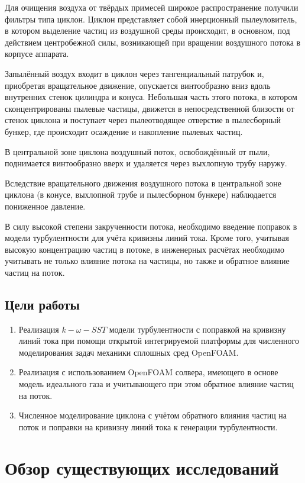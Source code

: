 \documentclass[pdftex,a4paper,12pt]{article}
\begin{document}
	Для очищения воздуха от твёрдых примесей широкое распространение получили фильтры типа циклон. Циклон представляет собой инерционный пылеуловитель, в котором выделение частиц из воздушной среды происходит, в основном, под действием центробежной силы, возникающей при вращении воздушного потока в корпусе аппарата.
	
	Запылённый воздух входит в циклон через тангенциальный патрубок и, приобретая вращательное движение, опускается винтообразно вниз вдоль внутренних стенок цилиндра и конуса. Небольшая часть этого потока, в котором сконцентрированы пылевые частицы, движется в непосредственной близости от стенок циклона и поступает через пылеотводящее отверстие в пылесборный бункер, где происходит осаждение и накопление пылевых частиц.
	
	В центральной зоне циклона воздушный поток, освобождённый от пыли, поднимается винтообразно вверх и удаляется через выхлопную трубу наружу.
	
	Вследствие вращательного движения воздушного потока в центральной зоне циклона (в конусе, выхлопной трубе и пылесборном бункере) наблюдается пониженное давление.\cite{instructions}
	
	В силу высокой степени закрученности потока, необходимо введение поправок в модели турбулентности для учёта кривизны линий тока. Кроме того, учитывая высокую концентрацию частиц в потоке, в инженерных расчётах необходимо учитывать не только влияние потока на частицы, но также и обратное влияние частиц на поток.
	
\subsection{Цели работы}
	\begin{enumerate}
		\item Реализация $k-\omega-SST$ модели турбулентности с поправкой на кривизну линий тока при помощи открытой интегрируемой платформы для численного моделирования задач механики сплошных сред OpenFOAM.
		\item Реализация с использованием OpenFOAM солвера, имеющего в основе модель идеального газа и учитывающего при этом обратное влияние частиц на поток.
		\item Численное моделирование циклона с учётом обратного влияния частиц на поток и поправки на кривизну линий тока к генерации турбулентности.
	\end{enumerate}
\newpage

\section{Обзор существующих исследований}
\end{document}
